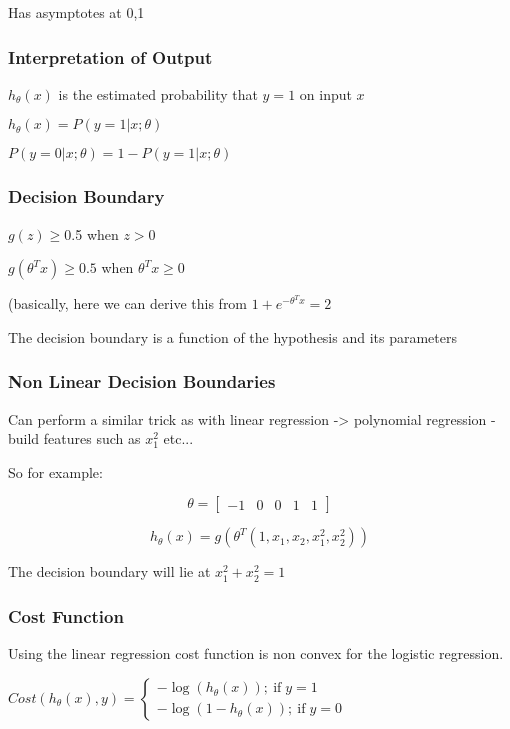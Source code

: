 {{{Has  asymptotes at {0,1}

\subsubsection{Interpretation of Output}

$h_\theta(x)$ is the estimated probability that  $y=1$ on input $x$ 

$h_\theta(x) = P(y=1|x;\theta)$ 

$P(y=0|x;\theta) = 1-P(y=1|x;\theta)$

\subsubsection{Decision Boundary}

$g(z) \ge 0$.5 when $z>0$ 

$g(\theta^T x ) \ge 0.5$ when $\theta^Tx \ge 0$

(basically, here we  can derive this from $1+e^{-\theta^T x}  = 2$

The decision boundary is a function of the hypothesis and its parameters

\subsubsection{Non Linear Decision Boundaries}

Can perform a similar trick as with linear regression -> polynomial regression - build features such as $x_1^2$ etc...

So for example: 

$$\theta = \left[ \begin{matrix} -1 & 0 & 0  & 1 & 1 \end{matrix} \right]$$

$$h_\theta(x) = g(\theta^T(1,x_1,x_2,x_1^2,x_2^2 )) $$

The decision boundary will lie at $x_1^2 + x_2^2 = 1$

\subsubsection{Cost Function}

Using the linear regression cost function is non convex for the logistic regression.

$Cost(h_\theta(x),y) = \begin{cases} -\log(h_\theta(x))  ;\ \text{if} \;  y=1 \\ -\log(1-h_\theta(x))   ;\ \text{if} \;  y=0  \end{cases}$

}}}
